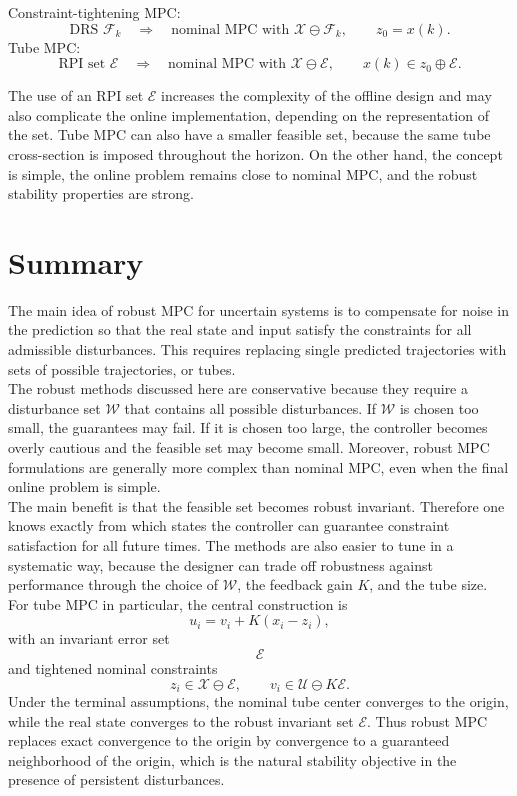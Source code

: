 \begin{theorembox}
Constraint-tightening MPC:
\[
    \text{DRS } \mathcal F_k
    \quad\Longrightarrow\quad
    \text{nominal MPC with } \mathcal X\ominus\mathcal F_k,
    \qquad
    z_0=x(k).
\]
Tube MPC:
\[
    \text{RPI set } \mathcal E
    \quad\Longrightarrow\quad
    \text{nominal MPC with } \mathcal X\ominus\mathcal E,
    \qquad
    x(k)\in z_0\oplus\mathcal E.
\]
\end{theorembox}

The use of an RPI set \(\mathcal E\) increases the complexity of the offline design and may also
complicate the online implementation, depending on the representation of the set. Tube MPC can
also have a smaller feasible set, because the same tube cross-section is imposed throughout the
horizon. On the other hand, the concept is simple, the online problem remains close to nominal
MPC, and the robust stability properties are strong.

\section{Summary}

The main idea of robust MPC for uncertain systems is to compensate for noise in the prediction
so that the real state and input satisfy the constraints for all admissible disturbances. This
requires replacing single predicted trajectories with sets of possible trajectories, or tubes.\\

The robust methods discussed here are conservative because they require a disturbance set
\(\mathcal W\) that contains all possible disturbances. If \(\mathcal W\) is chosen too small, the
guarantees may fail. If it is chosen too large, the controller becomes overly cautious and the
feasible set may become small. Moreover, robust MPC formulations are generally more complex
than nominal MPC, even when the final online problem is simple.\\

The main benefit is that the feasible set becomes robust invariant. Therefore one knows exactly
from which states the controller can guarantee constraint satisfaction for all future times. The
methods are also easier to tune in a systematic way, because the designer can trade off robustness
against performance through the choice of \(\mathcal W\), the feedback gain \(K\), and the tube
size.\\

For tube MPC in particular, the central construction is
\[
    u_i=v_i+K(x_i-z_i),
\]
with an invariant error set
\[
    \mathcal E
\]
and tightened nominal constraints
\[
    z_i\in\mathcal X\ominus\mathcal E,
    \qquad
    v_i\in\mathcal U\ominus K\mathcal E.
\]
Under the terminal assumptions, the nominal tube center converges to the origin, while the real
state converges to the robust invariant set \(\mathcal E\). Thus robust MPC replaces exact
convergence to the origin by convergence to a guaranteed neighborhood of the origin, which is
the natural stability objective in the presence of persistent disturbances.